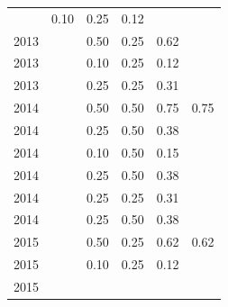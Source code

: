 \begin{table}[H]
\begin{tabular}{| l | c | c | c | c | c |}
          &
          0.10
          &
          0.25
          &
          0.12
          &
          \\
            2013
          &
          
          &
          0.50
          &
          0.25
          &
          0.62
          &
          \\
            2013
          &
          
          &
          0.10
          &
          0.25
          &
          0.12
          &
          \\
            2013
          &
          
          &
          0.25
          &
          0.25
          &
          0.31
          &
          \\
\hline
            2014
          &
          
          &
          0.50
          &
          0.50
          &
          0.75
          &
            {\color{blue} 0.75}
          \\
            2014
          &
          
          &
          0.25
          &
          0.50
          &
          0.38
          &
          \\
            2014
          &
          
          &
          0.10
          &
          0.50
          &
          0.15
          &
          \\
            2014
          &
          
          &
          0.25
          &
          0.50
          &
          0.38
          &
          \\
            2014
          &
          
          &
          0.25
          &
          0.25
          &
          0.31
          &
          \\
            2014
          &
          
          &
          0.25
          &
          0.50
          &
          0.38
          &
          \\
\hline
            2015
          &
          
          &
          0.50
          &
          0.25
          &
          0.62
          &
            {\color{blue} 0.62}
          \\
            2015
          &
          
          &
          0.10
          &
          0.25
          &
          0.12
          &
          \\
            2015
          &
          

\end{tabular}
\end{table}
